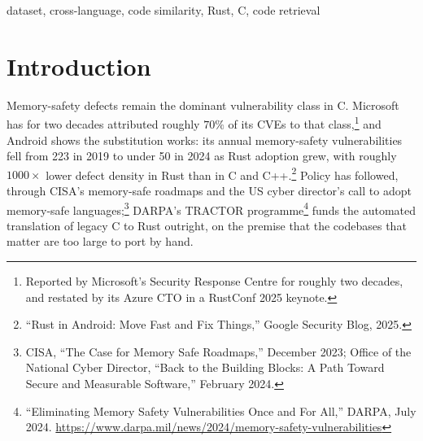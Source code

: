 \begin{abstract}
C-to-Rust migration is an active agenda, but no dataset pairs the two
languages at the level of whole solutions to a shared problem. We present
\dsname, 1857 C/Rust implementation pairs drawn from competitive programming
archives, normalised, deduplicated, and stratified into difficulty tiers by
zero-shot cross-language embedding similarity, with per-record provenance and
licensing. Cross-language retrieval is hard on this data, and harder than a
single baseline would suggest: TF-IDF over shared identifiers reaches
MRR $0.21$ and so beats a pretrained code model at $0.19$, which on the
hardest quarter of the data scores $1.7\times$ chance. Finetuning reaches
$0.79$, and lifts that hardest quarter $10\times$. Renaming every user
identifier settles what is being learned: the finetuned models keep 96--97\% of
their accuracy without them, while the pretrained model keeps 66\% --- less
than the lexical baseline does --- and on structurally divergent pairs the
finetuned models are \emph{better} without identifiers than with them.
\end{abstract}

\begin{IEEEkeywords}
dataset, cross-language, code similarity, Rust, C, code retrieval
\end{IEEEkeywords}

\section{Introduction}
\label{sec:intro}

Memory-safety defects remain the dominant vulnerability class in C. Microsoft
has for two decades attributed roughly $70\%$ of its CVEs to that
class,\footnote{Reported by Microsoft's Security Response Centre for roughly
two decades, and restated by its Azure CTO in a RustConf 2025 keynote.} and
Android shows the substitution works: its annual memory-safety vulnerabilities
fell from 223 in 2019 to under 50 in 2024 as Rust adoption grew, with roughly
$1000\times$ lower defect density in Rust than in C and
C++.\footnote{``Rust in Android: Move Fast and Fix Things,'' Google Security
Blog, 2025.} Policy has followed, through CISA's memory-safe roadmaps and the
US cyber director's call to adopt memory-safe languages;\footnote{CISA, ``The
Case for Memory Safe Roadmaps,'' December 2023; Office of the National Cyber
Director, ``Back to the Building Blocks: A Path Toward Secure and Measurable
Software,'' February 2024.} DARPA's TRACTOR programme\footnote{``Eliminating
Memory Safety Vulnerabilities Once and For All,'' DARPA, July 2024.
\url{https://www.darpa.mil/news/2024/memory-safety-vulnerabilities}} funds the
automated translation of legacy C
to Rust outright, on the premise that the codebases that matter are too large
to port by hand.

